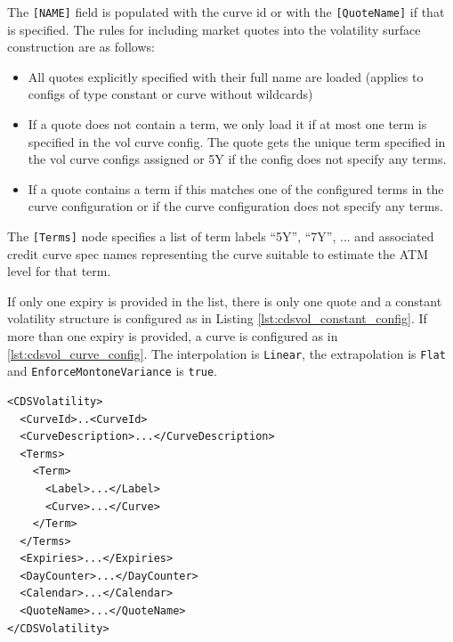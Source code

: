 The \lstinline![NAME]! field is populated with the curve id or with the \lstinline![QuoteName]! if that is specified. The rules for including market quotes into the volatility surface construction are as follows:

\begin{itemize}
\item All quotes explicitly specified with their full name are loaded (applies to configs of type constant or curve
  without wildcards)
\item If a quote does not contain a term, we only load it if at most one term is specified in the vol curve config. The
  quote gets the unique term specified in the vol curve configs assigned or 5Y if the config does not specify any terms.
\item If a quote contains a term if this matches one of the configured terms in the curve configuration or if the curve
  configuration does not specify any terms.
\end{itemize}

The \lstinline![Terms]! node specifies a list of term labels ``5Y'', ``7Y'', ... and associated credit curve spec names
representing the curve suitable to estimate the ATM level for that term.

If only one expiry is provided in the list, there is only one quote and a constant volatility structure is configured as in Listing \ref{lst:cdsvol_constant_config}. If more than one expiry is provided, a curve is configured as in \ref{lst:cdsvol_curve_config}. The interpolation is \lstinline!Linear!, the extrapolation is \lstinline!Flat! and \lstinline!EnforceMontoneVariance! is \lstinline!true!.

\begin{longlisting}
\begin{verbatim}
<CDSVolatility>
  <CurveId>..<CurveId>
  <CurveDescription>...</CurveDescription>
  <Terms>
    <Term>
      <Label>...</Label>
      <Curve>...</Curve>
    </Term>
  </Terms>
  <Expiries>...</Expiries>
  <DayCounter>...</DayCounter>
  <Calendar>...</Calendar>
  <QuoteName>...</QuoteName>
</CDSVolatility>
\end{verbatim}
\caption{Legacy deprecated CDS volatility curve configuration}
\label{lst:cdsvol_curve_config_alt}
\end{longlisting}

